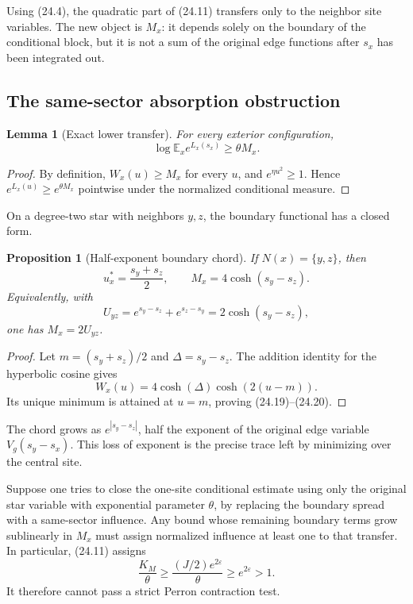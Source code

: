 \documentclass[11pt]{article}
\newtheorem{proposition}[theorem]{Proposition}
\newtheorem{lemma}[theorem]{Lemma}
\theoremstyle{remark}
\begin{document}
Using (24.4), the quadratic part of (24.11) transfers only to the
neighbor site variables.  The new object is \(M_x\): it depends solely
on the boundary of the conditional block, but it is not a sum of the
original edge functions after \(s_x\) has been integrated out.

\subsection{The same-sector absorption obstruction}

\begin{lemma}[Exact lower transfer]
\label{lem:v17v24-lower}
For every exterior configuration,
\[
 \log\mathbb E_x e^{L_x(s_x)}\geq\theta M_x.       \tag{24.18}
\]
\end{lemma}

\begin{proof}
By definition, \(W_x(u)\geq M_x\) for every \(u\), and
\(e^{\eta u^2}\geq1\).  Hence
\(e^{L_x(u)}\geq e^{\theta M_x}\) pointwise under the normalized
conditional measure.
\end{proof}

On a degree-two star with neighbors \(y,z\), the boundary functional
has a closed form.

\begin{proposition}[Half-exponent boundary chord]
\label{prop:v17v24-chord}
If \(N(x)=\{y,z\}\), then
\[
 u_x^*=\frac{s_y+s_z}{2},
 \qquad
 M_x=4\cosh(s_y-s_z).                              \tag{24.19}
\]
Equivalently, with
\[
 U_{yz}=e^{s_y-s_z}+e^{s_z-s_y}=2\cosh(s_y-s_z),  \tag{24.20}
\]
one has \(M_x=2U_{yz}\).
\end{proposition}

\begin{proof}
Let \(m=(s_y+s_z)/2\) and \(\Delta=s_y-s_z\).  The addition identity
for the hyperbolic cosine gives
\[
 W_x(u)=4\cosh(\Delta)\cosh(2(u-m)).               \tag{24.21}
\]
Its unique minimum is attained at \(u=m\), proving (24.19)--(24.20).
\end{proof}

The chord grows as \(e^{|s_y-s_z|}\), half the exponent of the
original edge variable \(V_g(s_y-s_x)\).  This loss of exponent is the
precise trace left by minimizing over the central site.

\begin{countertheorem}
\label{ctr:v17v24-self}
Suppose one tries to close the one-site conditional estimate using
only the original star variable with exponential parameter \(\theta\),
by replacing the boundary spread with a same-sector influence.  Any
bound whose remaining boundary terms grow sublinearly in \(M_x\) must
assign normalized influence at least one to that transfer.  In
particular, (24.11) assigns
\[
 \frac{K_M}{\theta}
 \geq\frac{(J/2)e^{2\varepsilon}}{\theta}
 \geq e^{2\varepsilon}>1.                         \tag{24.22}
\]
It therefore cannot pass a strict Perron contraction test.
\end{countertheorem}
\end{document}
